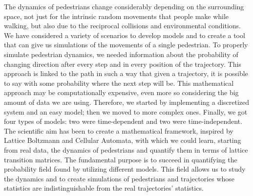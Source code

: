 \documentclass{standalone}
\begin{document}
The dynamics of pedestrians change considerably depending on the surrounding space, not just for the intrinsic random movements that people make while walking, but also due to the reciprocal collisions and environmental conditions. 
We have considered a variety of scenarios to develop models and to create a tool that can give us simulations of the movements of a single pedestrian. 
To properly simulate pedestrian dynamics, we needed information about the probability of changing direction after every step and in every position of the trajectory. 
This approach is linked to the path in such a way that given a trajectory, it is possible to say with some probability where the next step will be. 
This mathematical approach may be computationally expensive, even more so considering the big amount of data we are using. 
Therefore, we started by implementing a discretized system and an easy model; then we moved to more complex ones. 
Finally, we got four types of models: two were time-dependent and two were time-independent. 
The scientific aim has been to create a mathematical framework, inspired by Lattice Boltzmann and Cellular Automata, with which we could learn, starting from real data, the dynamics of pedestrians and quantify them in terms of lattice transition matrices. 
The fundamental purpose is to succeed in quantifying the probability field found by utilizing different models. 
This field allows us to study the dynamics and to create simulations of pedestrians and trajectories whose statistics are indistinguishable from the real trajectories’ statistics.
\end{document}
